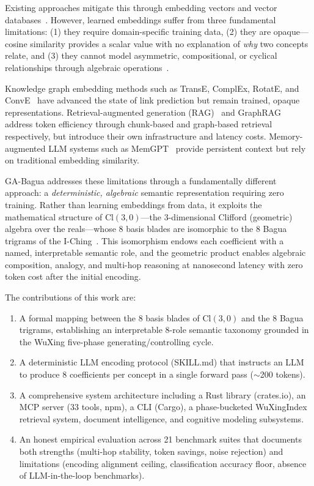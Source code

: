\documentclass[11pt,a4paper]{article}
\newcommand{\Cl}{\mathrm{Cl}}
\begin{document}
Existing approaches mitigate this through embedding vectors and vector
databases~\cite{johnson2019pgvector,karpukhin2020dpr}. However, learned
embeddings suffer from three fundamental limitations: (1) they require
domain-specific training data, (2) they are opaque---cosine similarity
provides a scalar value with no explanation of \emph{why} two concepts relate,
and (3) they cannot model asymmetric, compositional, or cyclical relationships
through algebraic operations~\cite{trouillon2016complex,sun2019rotate}.

Knowledge graph embedding methods such as TransE, ComplEx, RotatE, and
ConvE~\cite{dettmers2018conve,vashishth2020composition,nickel2011three,yang2015embedding}
have advanced the state of link prediction but remain trained, opaque
representations. Retrieval-augmented generation (RAG)~\cite{lewis2020rag} and
GraphRAG~\cite{edge2024graphrag} address token efficiency through chunk-based
and graph-based retrieval respectively, but introduce their own infrastructure
and latency costs. Memory-augmented LLM systems such as
MemGPT~\cite{packer2024memgpt} provide persistent context but rely on
traditional embedding similarity.

GA-Bagua addresses these limitations through a fundamentally different
approach: a \emph{deterministic, algebraic} semantic representation requiring
zero training. Rather than learning embeddings from data, it exploits the
mathematical structure of $\Cl(3,0)$---the 3-dimensional Clifford (geometric)
algebra over the reals---whose 8 basis blades are isomorphic to the 8 Bagua
trigrams of the I-Ching~\cite{wilhelm1967iching,needham1956wuxing}. This
isomorphism endows each coefficient with a named, interpretable semantic role,
and the geometric product enables algebraic composition, analogy, and
multi-hop reasoning at nanosecond latency with zero token cost after the
initial encoding.

The contributions of this work are:
\begin{enumerate}[nosep]
\item A formal mapping between the 8 basis blades of $\Cl(3,0)$ and the 8
  Bagua trigrams, establishing an interpretable 8-role semantic taxonomy
  grounded in the WuXing five-phase generating/controlling cycle.
\item A deterministic LLM encoding protocol (SKILL.md) that instructs an LLM
  to produce 8 coefficients per concept in a single forward pass ($\sim$200
  tokens).
\item A comprehensive system architecture including a Rust library (crates.io),
  an MCP server (33 tools, npm), a CLI (Cargo), a phase-bucketed WuXingIndex
  retrieval system, document intelligence, and cognitive modeling subsystems.
\item An honest empirical evaluation across 21 benchmark suites that documents
  both strengths (multi-hop stability, token savings, noise rejection) and
  limitations (encoding alignment ceiling, classification accuracy floor,
  absence of LLM-in-the-loop benchmarks).
\end{enumerate}
\end{document}
